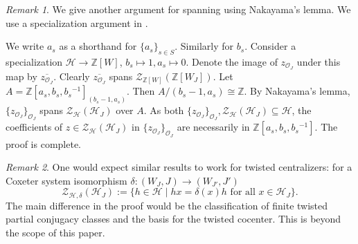 \documentclass[a4paper, reqno, 14pt]{amsart}
\def\d{\delta}
\def\i{{^{-1}}}
\def\subset{\subseteq}
\def\co{\mathcal{O}}
\def\ch{\mathcal{H}}
\theoremstyle{definition}
\theoremstyle{remark}
\newtheorem*{rmk}{Remark}
\numberwithin{equation}{section}
\numberwithin{thm}{section}
\begin{document}
    \begin{rmk}
        We give another argument for spanning using Nakayama's lemma. We use a specialization argument in \cite{lusztig1983singularities}.

            We write $a_s$ as a shorthand for $\{a_s\}_{s\in S}$. Similarly for $b_s$. Consider a specialization $\ch\to \mathbb{Z}[W]$, $b_s\mapsto 1, a_s\mapsto 0$. Denote  the image of $z_{\co_J}$ under this map by $\overline{z_{\co_J}}$. Clearly $\overline{z_{\co_J}}$ spans $\mathcal{Z}_{\mathbb{Z}[W]}(\mathbb{Z}[W_{J}])$. Let $A=\mathbb{Z}[a_s,b_s,b_s\i]_{(b_s-1,a_s)}$. Then $A/(b_s-1,a_s)\cong\mathbb{Z}$. By Nakayama's lemma, $\{z_{\co_J}\}_{\co_J}$ spans  $\mathcal{Z}_{\mathcal{H}}(\mathcal{H}_{J})$ over $A$. As both $\{z_{\co_J}\}_{\co_J}, \mathcal{Z}_{\mathcal{H}}(\mathcal{H}_{J})\subset \ch$, the coefficients of $z\in \mathcal{Z}_{\mathcal{H}}(\mathcal{H}_{J})$ in  $\{z_{\co_J}\}_{\co_J}$ are necessarily in $\mathbb{Z}[a_s,b_s,b_s\i]$. The proof is complete.
    \end{rmk}
    \begin{rmk}
        One would expect similar results to work for twisted centralizers: for a Coxeter system isomorphism $\d:(W_J,J)\to(W_{J'},J')$ 
\[
\mathcal{Z}_{\ch,\d}(\ch_J) := \{ h \in \ch \mid h x = \d(x) h \text{ for all } x \in \ch_J \}.
\]
    The main difference in the proof would be the classification of finite twisted partial conjugacy classes and the basis for the twisted cocenter. This is beyond the scope of this paper.
    
    \end{rmk}




































\end{document}
